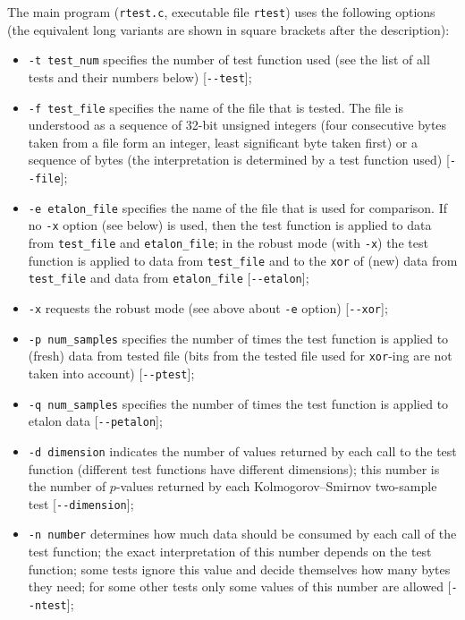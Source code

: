 \documentclass[12pt,a4paper,fullpage]{article}
\begin{document}
The main program (\texttt{rtest.c}, executable file \texttt{rtest}) uses the following options (the equivalent long variants are shown in square brackets after the description):
\begin{itemize}

\item \texttt{-t test\_num} specifies the number of test function used (see the list of all tests and their numbers below) [\texttt{{-}-test}];

\item \texttt{-f test\_file} specifies the name of the file that is tested. The file is understood as a sequence of 32-bit unsigned integers (four consecutive bytes taken from a file form an integer, least significant byte taken first) or a sequence of bytes (the interpretation is determined by a test function used) [\texttt{{-}-file}];

\item \texttt{-e etalon\_file} specifies the name of the file that is used for comparison. If no \texttt{-x} option (see below) is used, then the test function is applied to data from \texttt{test\_file} and \texttt{etalon\_file}; in the robust mode (with \texttt{-x}) the test function is applied to data from \texttt{test\_file} and to the \texttt{xor} of (new) data from \texttt{test\_file} and data from \texttt{etalon\_file} [\texttt{{-}-etalon}];

\item \texttt{-x} requests the robust mode (see above about \texttt{-e} option) [\texttt{{-}-xor}];

\item \texttt{-p num\_samples} specifies the number of times the test function is applied to (fresh) data from tested file (bits from the tested file used for \texttt{xor}-ing are not taken into account) [\texttt{{-}-ptest}];

\item \texttt{-q num\_samples} specifies the number of times the test function is applied to etalon data [\texttt{{-}-petalon}];

\item \texttt{-d dimension} indicates the number of values returned by each call to the test function (different test functions have different dimensions); this number is the number of $p$-values returned by each Kolmogorov--Smirnov two-sample test [\texttt{{-}-dimension}];

\item \texttt{-n number} determines how much data should be consumed by each call of the test function; the exact interpretation of this number depends on the test function; some tests ignore this value and decide themselves how many bytes they need; for some other tests only some values of this number are allowed [\texttt{{-}-ntest}];


\end{itemize}
\end{document}
